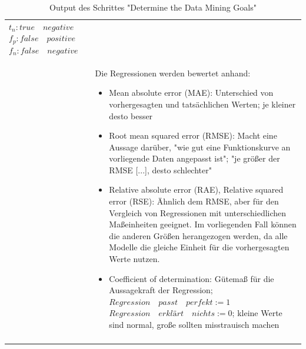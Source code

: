 \begin{longtable}[!h]{|p{}|p{12cm}|}
$ t_{n} : true \quad negative $ \newline
$ f_{p} : false \quad positive $ \newline
$ f_{n} : false \quad negative $ \newline
\\
& Die Regressionen werden bewertet anhand:
\begin{itemize}
\item Mean absolute error (MAE): Unterschied von vorhergesagten und tatsächlichen Werten; je kleiner desto besser\citep{mircosoft_evaluate_2017}
\item Root mean squared error (RMSE): Macht eine Aussage darüber, "wie gut eine Funktionskurve an vorliegende Daten angepasst ist"; "je größer der RMSE [...], desto schlechter"\citep{statista_root_nodate}
\item Relative absolute error (RAE), Relative squared error (RSE): Ähnlich dem RMSE, aber für den Vergleich von Regressionen mit unterschiedlichen Maßeinheiten geeignet.\citep{dr._sayad_model_2017} Im vorliegenden Fall können die anderen Größen herangezogen werden, da alle Modelle die gleiche Einheit für die vorhergesagten Werte nutzen.
\item Coefficient of determination: Gütemaß für die Aussagekraft der Regression; 
\newline
$Regression \quad passt \quad perfekt := 1$ 
\newline 
$Regression \quad erklärt \quad nichts := 0$;
\newline 
kleine Werte sind normal, große  sollten misstrauisch machen\citep{mircosoft_evaluate_2017}
\end{itemize}
\\
\hline
\caption{Output des Schrittes "Determine the Data Mining Goals"}
\end{longtable}


 \newline
{} \newline
{}

